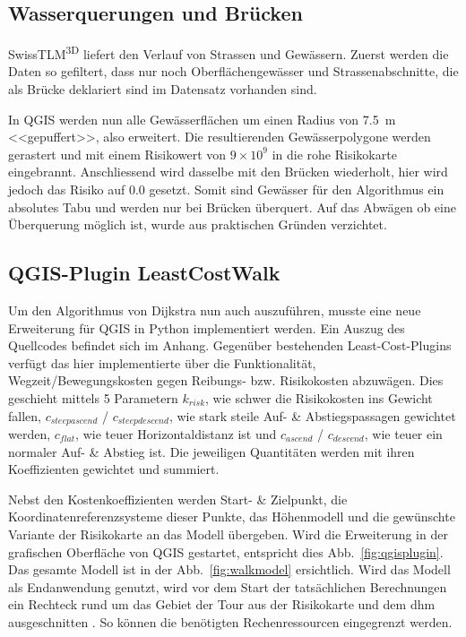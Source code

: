 \subsection{Wasserquerungen und Brücken}

SwissTLM\textsuperscript{3D} liefert den Verlauf von Strassen und Gewässern. Zuerst werden die Daten so gefiltert, dass nur noch Oberflächengewässer und Strassenabschnitte, die als Brücke deklariert sind im Datensatz vorhanden sind.

In QGIS werden nun alle Gewässerflächen um einen Radius von \qty{7.5}{m} <<gepuffert>>, also erweitert. Die resultierenden Gewässerpolygone werden gerastert und mit einem Risikowert von $9 \times 10^{9}$ in die rohe Risikokarte eingebrannt. Anschliessend wird dasselbe mit den Brücken wiederholt, hier wird jedoch das Risiko auf $0.0$ gesetzt. Somit sind Gewässer für den Algorithmus ein absolutes Tabu und werden nur bei Brücken überquert. Auf das Abwägen ob eine Überquerung möglich ist, wurde aus praktischen Gründen verzichtet.


\subsection{QGIS-Plugin LeastCostWalk}

Um den Algorithmus von Dijkstra nun auch auszuführen, musste eine neue Erweiterung für QGIS in Python implementiert werden. Ein Auszug des Quellcodes befindet sich im Anhang. Gegenüber bestehenden Least-Cost-Plugins verfügt das hier implementierte über die Funktionalität, Wegzeit/Bewegungskosten gegen Reibungs- bzw. Risikokosten abzuwägen. Dies geschieht mittels 5 Parametern $k_{risk}$, wie schwer die Risikokosten ins Gewicht fallen, $c_{steepascend}$ / $c_{steepdescend}$, wie stark steile Auf- \& Abstiegspassagen gewichtet werden, $c_{flat}$, wie teuer Horizontaldistanz ist und $c_{ascend}$ / $c_{descend}$, wie teuer ein normaler Auf- \& Abstieg ist. Die jeweiligen Quantitäten werden mit ihren Koeffizienten gewichtet und summiert.

Nebst den Kostenkoeffizienten werden Start- \& Zielpunkt, die Koordinatenreferenzsysteme dieser Punkte, das Höhenmodell und die gewünschte Variante der Risikokarte an das Modell übergeben. Wird die Erweiterung in der grafischen Oberfläche von QGIS gestartet, entspricht dies Abb.\ \ref{fig:qgisplugin}. Das gesamte Modell ist in der Abb.\ \ref{fig:walkmodel} ersichtlich. Wird das Modell als Endanwendung genutzt, wird vor dem Start der tatsächlichen Berechnungen ein Rechteck rund um das Gebiet der Tour aus der Risikokarte und dem \acrshort{dhm} ausgeschnitten . So können die benötigten Rechenressourcen eingegrenzt werden.

